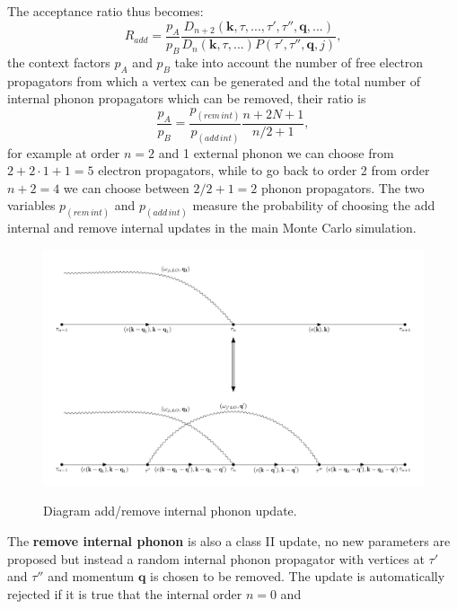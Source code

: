The acceptance ratio thus becomes:
\begin{equation}
    R_{add}=\frac{p_A}{p_B}\frac{D_{n+2}(\mathbf{k},\tau,...,\tau',\tau'',\mathbf{q},...)}{D_n(\mathbf{k},\tau,...)P(\tau',\tau'',\mathbf{q},j)},
\end{equation}
the context factors $p_A$ and $p_B$ take into account the number of free electron propagators from which a vertex can be generated and the total number of internal phonon propagators 
which can be removed, their ratio is
\begin{equation}
    \frac{p_A}{p_B}=\frac{p_{(rem\hspace{2pt}int)}}{p_{(add\hspace{2pt}int)}}\frac{n+2N+1}{n/2+1},
\end{equation}
for example at order $n=2$ and 1 external phonon we can choose from $2+2\cdot1+1=5$ electron propagators, while to go back to 
order 2 from order $n+2=4$ we can choose between $2/2+1=2$ phonon propagators. The two variables $p_{(rem\hspace{2pt}int)}$ and 
$p_{(add\hspace{2pt}int)}$ measure the probability of choosing the add internal and remove internal updates in the main Monte Carlo simulation.
\begin{figure}[H]
    \centering
    \includegraphics[scale=0.6]{add_update.pdf}
    \label{fig:add_update}
    \caption{Diagram add/remove internal phonon update.}
\end{figure}
The \textbf{remove internal phonon} is also a class II update, no new parameters are proposed but instead a random internal phonon propagator with 
vertices at $\tau'$ and $\tau''$ and momentum $\mathbf{q}$ is chosen to be removed. The update is automatically rejected if it is true that the internal order $n=0$ and 
